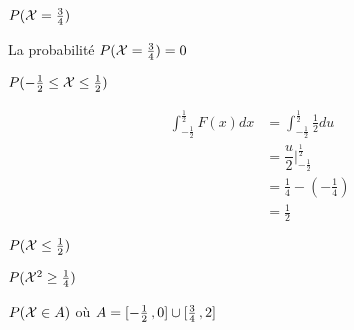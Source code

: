 \begin{exo}
	\begin{subexo}{$P(\mathcal{X} = \frac{3}{4})$}
		\begin{center}
			La probabilité $P(\mathcal{X} = \frac{3}{4}) = 0$
		\end{center}
	\end{subexo}
	\begin{subexo}{$P(-\frac{1}{2} \leq \mathcal{X} \leq \frac{1}{2})$}
		\begin{flushleft}
			\begin{align*}
			\displaystyle\int_{-\frac{1}{2}}^{\frac{1}{2}}{F(x)}dx &=\int_{-\frac{1}{2}}^{\frac{1}{2}}{\frac{1}{2}}du\\
				&= \dfrac{u}{2}\bigg\vert_{-\frac{1}{2}}^{\frac{1}{2}}\\
				&= \frac{1}{4}-(-\frac{1}{4}) \\
				&= \frac{1}{2}
			\end{align*}
		\end{flushleft}
	\end{subexo}
	\begin{subexo}{$P(\mathcal{X} \leq \frac{1}{2})$}
	\end{subexo}
	\begin{subexo}{$P(\mathcal{X}^{2} \geq \frac{1}{4})$}
	\end{subexo}
	\begin{subexo}{$P(\mathcal{X} \in A)$ où $A = \mathopen{[}-\frac{1}{2}\mathpunct{},0\mathclose{]}\cup\mathopen{[}\frac{3}{4}\mathpunct{},2\mathclose{]}$}
	\end{subexo}
\end{exo}

